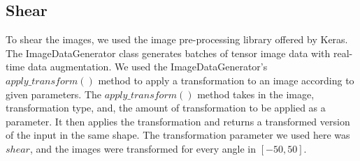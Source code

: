 \subsection{Shear} 
To shear the images, we used the image pre-processing library offered by Keras. The ImageDataGenerator class generates batches of tensor image data with real-time data augmentation. We used the ImageDataGenerator's $apply\_transform()$ method to apply a transformation to an image according to given parameters. The $apply\_transform()$ method takes in the image, transformation type, and, the amount of transformation to be applied as a parameter. It then applies the transformation and returns a transformed version of the input in the same shape.
The transformation parameter we used here was $shear$, and the images were transformed for every angle in $[-50, 50]$.

